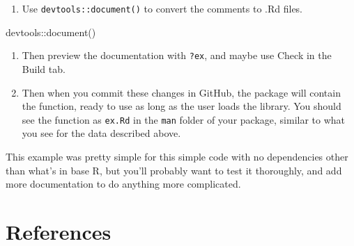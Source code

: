 \documentclass[
]{book}
\newenvironment{Shaded}{\begin{snugshade}}{\end{snugshade}}
\newcommand{\FunctionTok}[1]{\textcolor[rgb]{0,0,0}{#1}}
\newcommand{\NormalTok}[1]{#1}
\newcommand{\SpecialCharTok}[1]{\textcolor[rgb]{0,0,0}{#1}}
\providecommand{\tightlist}{%
  \setlength{\itemsep}{0pt}\setlength{\parskip}{0pt}}
\begin{document}
\begin{enumerate}
\def\labelenumi{\arabic{enumi}.}
\setcounter{enumi}{4}
\tightlist
\item
  Use \texttt{devtools::document()} to convert the comments to .Rd files.
\end{enumerate}

\begin{Shaded}
\begin{Highlighting}[]
\NormalTok{devtools}\SpecialCharTok{::}\FunctionTok{document}\NormalTok{()}
\end{Highlighting}
\end{Shaded}

\begin{enumerate}
\def\labelenumi{\arabic{enumi}.}
\setcounter{enumi}{5}
\item
  Then preview the documentation with \texttt{?ex}, and maybe use Check in the Build tab.
\item
  Then when you commit these changes in GitHub, the package will contain the function, ready to use as long as the user loads the library. You should see the function as \texttt{ex.Rd} in the \texttt{man} folder of your package, similar to what you see for the data described above.
\end{enumerate}

This example was pretty simple for this simple code with no dependencies other than what's in base R, but you'll probably want to test it thoroughly, and add more documentation to do anything more complicated.

\hypertarget{references}{%
\chapter*{References}\label{references}}
\end{document}
